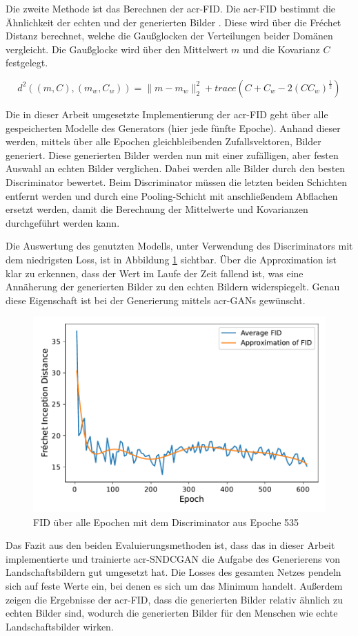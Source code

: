  Die zweite Methode ist das Berechnen der \gls{acr-FID}. Die \gls{acr-FID} bestimmt die
 Ähnlichkeit der echten und der generierten Bilder \cite{heusel_gans_2017}. Diese
 wird über die Fr\'echet Distanz berechnet, welche die Gaußglocken der
 Verteilungen beider Domänen vergleicht. Die Gaußglocke wird über den Mittelwert
 $m$ und die Kovarianz $C$ festgelegt. 
 
 \[d^2((m,C),(m_w,C_w)) =  \|m-m_w\|^2_2 + trace(C+ C_w - 2(CC_w)^{\frac{1}{2}})
 \]
 
 Die in dieser Arbeit umgesetzte Implementierung der \gls{acr-FID} geht über
 alle gespeicherten Modelle des Generators (hier jede fünfte Epoche). Anhand dieser
 werden,  
 mittels über alle Epochen gleichbleibenden Zufallsvektoren, Bilder generiert.
 Diese generierten Bilder werden nun mit einer zufälligen, aber festen Auswahl an echten
 Bilder verglichen. Dabei werden alle Bilder durch den besten Discriminator bewertet. Beim Discriminator müssen die letzten beiden Schichten entfernt werden
 und durch eine Pooling-Schicht mit anschließendem Abflachen ersetzt werden,
 damit die Berechnung der Mittelwerte und Kovarianzen durchgeführt werden kann. 
 
 Die Auswertung des genutzten Modells, unter Verwendung des Discriminators mit
 dem niedrigsten Loss, ist in Abbildung \ref{fig:plot_fids_gen} sichtbar. Über die
 Approximation ist klar zu erkennen, dass der Wert im Laufe der Zeit fallend
 ist, was eine Annäherung der generierten Bilder zu den echten Bildern
 widerspiegelt. Genau diese Eigenschaft ist bei der Generierung mittels \gls{acr-GAN}s
 gewünscht.
 
 \begin{figure}
 	\centering
 	\includegraphics[width=0.7\linewidth]{images/plot_line_plot_fids_gen}
 	\caption[FID des generierdene GANs]{FID über alle Epochen mit dem Discriminator aus Epoche 535}
 	\label{fig:plot_fids_gen}
 \end{figure}
 
 Das Fazit aus den beiden Evaluierungsmethoden ist, dass das in dieser Arbeit
 implementierte und trainierte \gls{acr-SNDCGAN} die Aufgabe des Generierens von
 Landschaftsbildern gut umgesetzt hat. Die Losses des gesamten Netzes pendeln
 sich auf feste Werte ein, bei denen es sich um das Minimum handelt. Außerdem zeigen die
 Ergebnisse der \gls{acr-FID}, dass die generierten Bilder relativ ähnlich
 zu echten Bilder sind, wodurch die generierten Bilder für den Menschen wie
 echte Landschaftsbilder wirken.
 
 